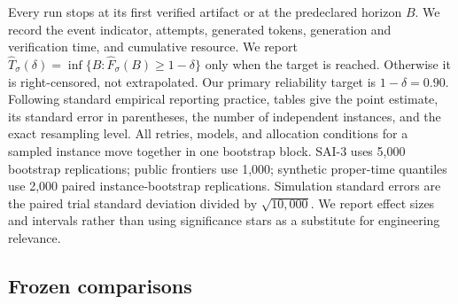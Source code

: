 \documentclass{article}
\theoremstyle{definition}
\theoremstyle{plain}
\theoremstyle{remark}
\begin{document}
\begin{table}[H]
\centering
\caption{Experimental design.  \(N_x\) counts distinct task instances.  A run
is one task--model execution through first verification or the horizon; SAI-3
also varies frozen signal--allocation cells.  Retries within a trace are not
independent observations.}
\label{tab:experimental-design}
\small
{}
\end{table}

Every run stops at its first verified artifact or at the predeclared horizon
\(B\).  We record the event indicator, attempts, generated tokens, generation
and verification time, and cumulative resource.  We report
\(\widehat T_\sigma(\delta)=\inf\{B:\widehat F_\sigma(B)\ge1-\delta\}\) only when the target is reached. Otherwise it is right-censored, not extrapolated. Our primary reliability target is \(1-\delta=0.90\).  Following standard
empirical reporting practice, tables give the point estimate, its standard
error in parentheses, the number of independent instances, and the exact
resampling level.  All retries,
models, and allocation conditions for a sampled instance move together in one
bootstrap block.  SAI-3 uses 5,000 bootstrap replications; public frontiers use
1,000; synthetic proper-time quantiles use 2,000 paired instance-bootstrap
replications.  Simulation standard errors are the paired trial standard
deviation divided by \(\sqrt{10{,}000}\).  We report effect sizes and intervals
rather than using significance stars as a substitute for engineering relevance.

\subsection{Frozen comparisons}
\end{document}
